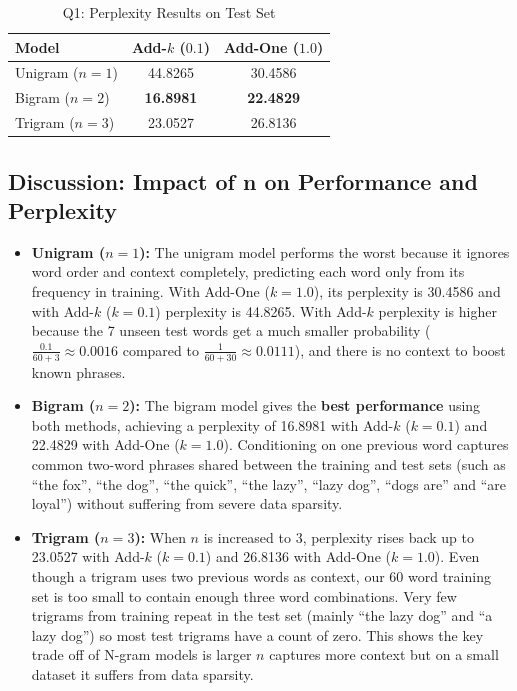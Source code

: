 \documentclass[sigconf]{acmart}
\begin{document}
\begin{table}[H]
\centering
\caption{Q1: Perplexity Results on Test Set}
\label{tab:q1-perplexity}
\begin{tabular}{@{}lcc@{}}
\toprule
\textbf{Model} & \textbf{Add-$k$ ($0.1$)} & \textbf{Add-One ($1.0$)} \\ \midrule
Unigram ($n = 1$) & 44.8265 & 30.4586 \\
Bigram ($n = 2$)  & \textbf{16.8981} & \textbf{22.4829} \\
Trigram ($n = 3$) & 23.0527 & 26.8136 \\ \bottomrule
\end{tabular}
\end{table}

\subsection{Discussion: Impact of n on Performance and Perplexity}
\begin{itemize}
    \item \textbf{Unigram ($n = 1$):} The unigram model performs the worst because it ignores word order and context completely, predicting each word only from its frequency in training. With Add-One ($k = 1.0$), its perplexity is 30.4586 and with Add-$k$ ($k = 0.1$) perplexity is 44.8265. With Add-$k$ perplexity is higher because the 7 unseen test words get a much smaller probability ($\frac{0.1}{60 + 3} \approx 0.0016$ compared to $\frac{1}{60 + 30} \approx 0.0111$), and there is no context to boost known phrases.
    \item \textbf{Bigram ($n = 2$):} The bigram model gives the \textbf{best performance} using both methods, achieving a perplexity of 16.8981 with Add-$k$ ($k = 0.1$) and 22.4829 with Add-One ($k = 1.0$). Conditioning on one previous word captures common two-word phrases shared between the training and test sets (such as ``the fox'', ``the dog'', ``the quick'', ``the lazy'', ``lazy dog'', ``dogs are'' and ``are loyal'') without suffering from severe data sparsity.
    \item \textbf{Trigram ($n = 3$):} When $n$ is increased to 3, perplexity rises back up to 23.0527 with Add-$k$ ($k = 0.1$) and 26.8136 with Add-One ($k = 1.0$). Even though a trigram uses two previous words as context, our 60 word training set is too small to contain enough three word combinations. Very few trigrams from training repeat in the test set (mainly ``the lazy dog'' and ``a lazy dog'') so most test trigrams have a count of zero. This shows the key trade off of N-gram models is larger $n$ captures more context but on a small dataset it suffers from data sparsity.
\end{itemize}
\end{document}
